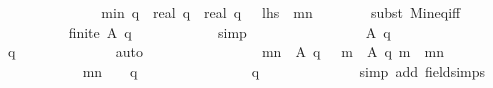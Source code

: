 \begin{isabellebody}
\ \ \ \ \ \ \isamarkupfalse%
\isanewline
\isanewline
\ \ \ \ \ \ \isamarkupfalse%
\ {\isachardoublequoteopen}{\isacharquery}min\ {\isacharparenleft}q{\isacharplus}{}{\isacharparenright}\ {\isacharequal}\ {\isacharparenleft}real\ q\ {\isacharminus}\ {}{\isacharparenright}{\isacharslash}real\ q{\isachardoublequoteclose}\ \ {\isacharparenleft}\ {\isachardoublequoteopen}{\isacharquery}lhs\ {\isacharequal}\ {\isacharquery}mn{\isachardoublequoteclose}{\isacharparenright}\isanewline
\ \ \ \ \ \ \isamarkupfalse%
\ {\isacharparenleft}subst\ Min{\isacharunderscore}eq{\isacharunderscore}iff{\isacharparenright}\isanewline
\ \ \ \ \ \ \ \ \isamarkupfalse%
\ {\isachardoublequoteopen}finite\ {\isacharparenleft}{\isacharquery}A\ {\isacharparenleft}q{\isacharplus}{}{\isacharparenright}{\isacharparenright}{\isachardoublequoteclose}\isanewline
\ \ \ \ \ \ \ \ \ \ \isamarkupfalse%
\ simp\isanewline
\ \ \ \ \ \ \isamarkupfalse%
\isanewline
\ \ \ \ \ \ \ \ \isamarkupfalse%
\ {\isachardoublequoteopen}{\isacharquery}A\ {\isacharparenleft}q{\isacharplus}{}{\isacharparenright}\ {\isasymnoteq}\ {\isacharbraceleft}{\isacharbraceright}{\isachardoublequoteclose}\isanewline
\ \ \ \ \ \ \ \ \ \ \isamarkupfalse%
\ {\isacharbackquoteopen}q\ {\isasymge}\ {}{\isacharbackquoteclose}\isanewline
\ \ \ \ \ \ \ \ \ \ \isamarkupfalse%
\ auto\isanewline
\ \ \ \ \ \ \isamarkupfalse%
\isanewline
\ \ \ \ \ \ \ \ \isamarkupfalse%
\ {\isachardoublequoteopen}{\isacharquery}mn\ {\isasymin}\ {\isacharquery}A\ {\isacharparenleft}q{\isacharplus}{}{\isacharparenright}\ {\isasymand}\ {\isacharparenleft}{\isasymforall}\ m{\isacharprime}\ {\isasymin}\ {\isacharquery}A\ {\isacharparenleft}q{\isacharplus}{}{\isacharparenright}{\isachardot}\ m{\isacharprime}\ {\isasymge}\ {\isacharquery}mn{\isacharparenright}{\isachardoublequoteclose}\isanewline
\ \ \ \ \ \ \ \ \isamarkupfalse%
\isanewline
\ \ \ \ \ \ \ \ \ \ \isamarkupfalse%
\ {\isachardoublequoteopen}{\isacharquery}mn\ {\isacharequal}\ {}\ {\isacharminus}\ {}{\isacharslash}q{\isachardoublequoteclose}\isanewline
\ \ \ \ \ \ \ \ \ \ \ \ \isamarkupfalse%
\ {\isacharbackquoteopen}{}\ {\isasymle}\ q{\isacharbackquoteclose}\isanewline
\ \ \ \ \ \ \ \ \ \ \ \ \isamarkupfalse%
\ {\isacharparenleft}simp\ add{\isacharcolon}\ field{\isacharunderscore}simps{\isacharparenright}\isanewline

\end{isabellebody}
